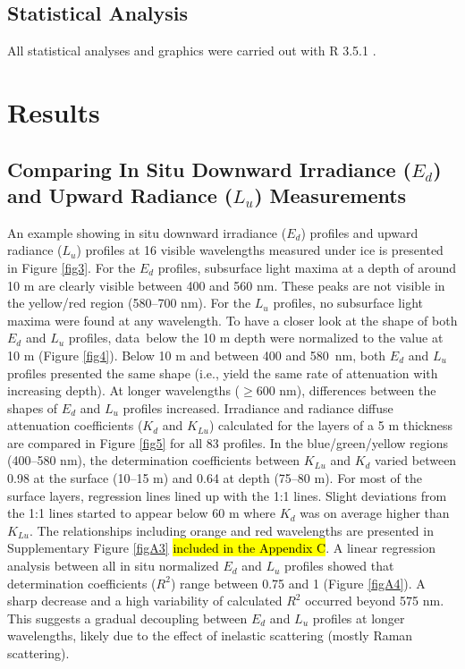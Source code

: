 \documentclass[applsci,article,accept,moreauthors,pdftex,10pt,a4paper]{Definitions/mdpi}
\newcommand{\ked}{\ensuremath{K_{d}}}
\newcommand{\klu}{\ensuremath{K_{Lu}}}
\newcommand{\ed}{\ensuremath{{E_d}}}
\newcommand{\lu}{\ensuremath{{L_u}}}
\newcommand{\rsquared}{\ensuremath{R^2}}
\begin{document}
\subsection{Statistical Analysis}

All statistical analyses and graphics were carried out with R 3.5.1 \citep{RCoreTeam2018}. 
%
\section{Results}
\unskip
\subsection{Comparing In Situ Downward Irradiance (\ed{}) and Upward Radiance (\lu{}) Measurements}

An example showing in situ downward irradiance (\ed{}) profiles and upward radiance (\lu{}) profiles at 16 visible wavelengths measured under ice is presented in Figure \ref{fig3}. For the \ed{} profiles, subsurface light maxima at a depth of around 10 m are clearly visible between 400 and 560 nm. These peaks are not visible in the yellow/red region (580--700 nm). For the \lu{} profiles, no subsurface light maxima were found at any wavelength. To have a closer look at the shape of both \ed{} and \lu{} profiles, data~below the 10 m depth were normalized to the value at 10 m (Figure \ref{fig4}). Below 10 m and between 400 and 580~nm, both \ed{} and \lu{} profiles presented the same shape (i.e., yield the same rate of attenuation with increasing depth). At longer wavelengths ($\ge$600 nm), differences between the shapes of \ed{} and \lu{} profiles increased. Irradiance and radiance diffuse attenuation coefficients (\ked{} and \klu{}) calculated for the layers of a 5 m thickness are compared in Figure \ref{fig5} for all 83 profiles. In the blue/green/yellow regions (400--580 nm), the determination coefficients between \klu{} and \ked{} varied between 0.98 at the surface (10--15 m) and 0.64 at depth (75--80 m). For most of the surface layers, regression lines lined up with the 1:1 lines. Slight deviations from the 1:1 lines started to appear below 60 m where \ked{} was on average higher than \klu{}. The relationships including orange and red wavelengths are presented in Supplementary Figure  \ref{figA3} \hl{included in the Appendix C}. A linear regression analysis between all in situ normalized \ed{} and \lu{} profiles showed that determination coefficients (\rsquared{}) range between 0.75 and 1 (Figure  \ref{figA4}). A sharp decrease and a high variability of calculated \rsquared{} occurred beyond 575 nm. This suggests a gradual decoupling between \ed{} and \lu{} profiles at longer wavelengths, likely due to the effect of inelastic scattering (mostly Raman scattering). 
\end{document}
